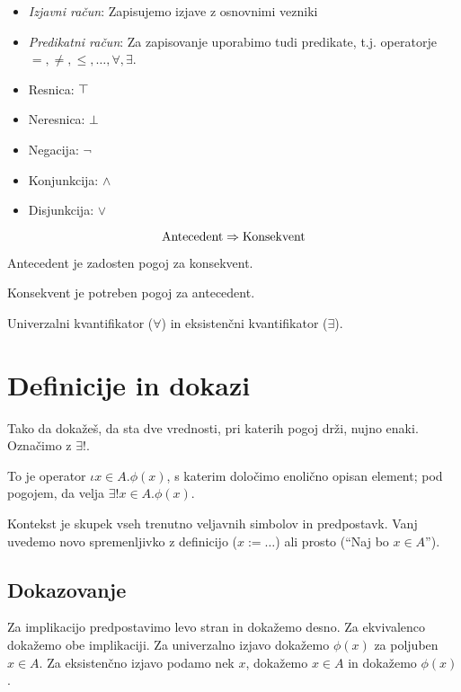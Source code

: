 \begin{itemize}
	\item \textit{Izjavni račun}: Zapisujemo izjave z osnovnimi vezniki
	\item \textit{Predikatni račun}: Za zapisovanje uporabimo tudi predikate, t.j. operatorje $=, \ne, \le, \ldots, \forall, \exists$.
\end{itemize}


\begin{itemize}
	\item Resnica: $\top$
	\item Neresnica: $\bot$
	\item Negacija: $\neg$
	\item Konjunkcija: $\land$
	\item Disjunkcija: $\lor$
\end{itemize}


\[
	\text{Antecedent} \Rightarrow \text{Konsekvent}
\]

Antecedent je zadosten pogoj za konsekvent.

Konsekvent je potreben pogoj za antecedent.


Univerzalni kvantifikator ($\forall$) in eksistenčni kvantifikator ($\exists$).

\section{Definicije in dokazi}


Tako da dokažeš, da sta dve vrednosti, pri katerih pogoj drži, nujno enaki. Označimo z $\exists!$.


To je operator $\iota x \in A.\phi(x)$, s katerim določimo enolično opisan element; pod pogojem, da velja $\exists!x \in A. \phi(x)$.


Kontekst je skupek vseh trenutno veljavnih simbolov in predpostavk. Vanj uvedemo novo spremenljivko z definicijo ($x := \ldots$) ali prosto ("`Naj bo $x \in A$"').

\subsection{Dokazovanje}


Za implikacijo predpostavimo levo stran in dokažemo desno. Za ekvivalenco dokažemo obe implikaciji. Za univerzalno izjavo dokažemo $\phi(x)$ za poljuben $x \in A$. Za eksistenčno izjavo podamo nek $x$, dokažemo $x \in A$ in dokažemo $\phi(x)$.